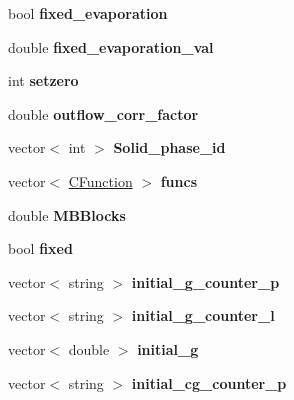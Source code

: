 \begin{DoxyCompactItemize}
bool {\bfseries fixed\+\_\+evaporation}
\item 
\mbox{\label{class_c_m_b_block_aafc23d991e9712750a86a218ab7886ea}} 
double {\bfseries fixed\+\_\+evaporation\+\_\+val}
\item 
\mbox{\label{class_c_m_b_block_af9e8d5cc2315507e9d94305ba0fd09c8}} 
int {\bfseries setzero}
\item 
\mbox{\label{class_c_m_b_block_a1a14bdf601a6a241e5b793f1436d74c2}} 
double {\bfseries outflow\+\_\+corr\+\_\+factor}
\item 
\mbox{\label{class_c_m_b_block_a42e530147cd8489e1485f9954cc93e39}} 
vector$<$ int $>$ {\bfseries Solid\+\_\+phase\+\_\+id}
\item 
\mbox{\label{class_c_m_b_block_ab99598f0e56926e498c97de2877d420c}} 
vector$<$ \hyperlink{class_c_function}{C\+Function} $>$ {\bfseries funcs}
\item 
\mbox{\label{class_c_m_b_block_a83ee1ab1b50ed341d353e3a9ab08f7a0}} 
double {\bfseries M\+B\+Blocks}
\item 
\mbox{\label{class_c_m_b_block_a60a8d85533072b4ceaa70ff5e2c3c5cc}} 
bool {\bfseries fixed}
\item 
\mbox{\label{class_c_m_b_block_a8a5973881bdef3477e684af2ce59b7fc}} 
vector$<$ string $>$ {\bfseries initial\+\_\+g\+\_\+counter\+\_\+p}
\item 
\mbox{\label{class_c_m_b_block_a1b972f7ec62e29e4f05c654e41431a19}} 
vector$<$ string $>$ {\bfseries initial\+\_\+g\+\_\+counter\+\_\+l}
\item 
\mbox{\label{class_c_m_b_block_a317e9ffe559615c2a412f43039559736}} 
vector$<$ double $>$ {\bfseries initial\+\_\+g}
\item 
\mbox{\label{class_c_m_b_block_a147c3fcb09a53c8863c21d236903c2c7}} 
vector$<$ string $>$ {\bfseries initial\+\_\+cg\+\_\+counter\+\_\+p}
\item 

\end{DoxyCompactItemize}
